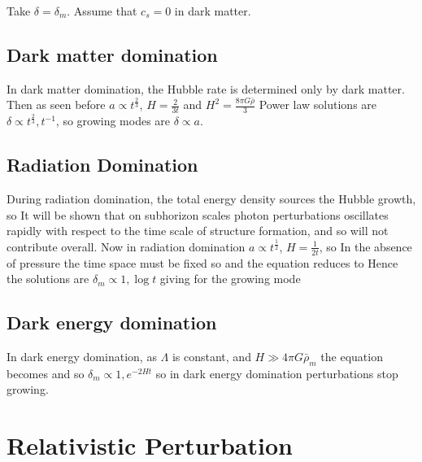 \documentclass{article}
\begin{document}
\begin{example}
Take $\delta=\delta_m$. Assume that $c_s=0$ in dark matter. 

\subsection{Dark matter domination}
In dark matter domination, the Hubble rate is determined only by dark matter. Then as seen before $a\propto t^{\frac{2}{3}}$,  $H=\frac{2}{3t}$ and $H^2=\frac{8\pi G\bar{\rho}}{3}$
Power law solutions are $\delta \propto t^\frac{2}{3}, t^{-1}$, so growing modes are $\delta \propto a$. 

\subsection{Radiation Domination}
During radiation domination, the total energy density sources the Hubble growth, so 
It will be shown that on subhorizon scales photon perturbations oscillates rapidly with respect to the time scale of structure formation, and so will not contribute overall. Now in radiation domination $a\propto t^\frac{1}{2}$, $H=\frac{1}{2t}$, so 
In the absence of pressure the time space must be fixed so 
and the equation reduces to 
Hence the solutions are $\delta_m \propto 1, \log t$ 
giving for the growing mode 
\subsection{Dark energy domination}
In dark energy domination, as $\Lambda$ is constant, and $H\gg 4\pi G\bar{\rho}_m$ the equation becomes 
and so $\delta_m \propto 1, e^{-2Ht}$ so in dark energy domination perturbations stop growing. 
\end{example}

\section{Relativistic Perturbation}
\end{document}
